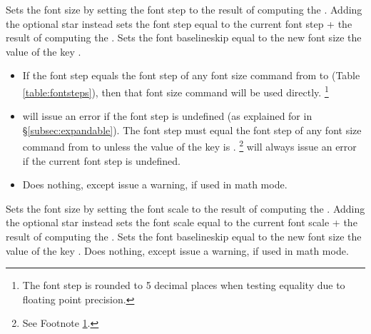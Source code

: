 \documentclass{beery}
\begin{document}
\begin{mydisplaycode}
   \sarg{} 
\end{mydisplaycode}

Sets the font size by setting the font step to the result of computing the .
Adding the optional star \sarg{} instead sets the font step equal to the current font step + the result of computing the .
Sets the font baselineskip equal to the new font size \texttimes{} the value of the key .

\begin{itemize}
  \item
  If the font step equals the font step of any font size command from  to  (Table \ref{table:fontsteps}), then that font size command will be used directly.%
  \footnote
    {%
      \label{fn:setfontstep}%
      The font step is rounded to \num{5} decimal places when testing equality due to floating point precision.%
    }
  \item
   will issue an error if the font step is undefined (as explained for  in \S\ref{subsec:expandable}).
  The font step must equal the font step of any font size command from  to  unless the value of the key  is .%
  \footnote{See Footnote \ref{fn:setfontstep}.}
   will always issue an error if the current font step is undefined.
  \item
  Does nothing, except issue a warning, if used in math mode.
\end{itemize}

\begin{mydisplaycode}
   \sarg{} 
\end{mydisplaycode}

Sets the font size by setting the font scale to the result of computing the .
Adding the optional star \sarg{} instead sets the font scale equal to the current font scale + the result of computing the .
Sets the font baselineskip equal to the new font size \texttimes{} the value of the key .
Does nothing, except issue a warning, if used in math mode.

\begin{mydisplaycode}
   \sarg{} 
\end{mydisplaycode}
\end{document}

